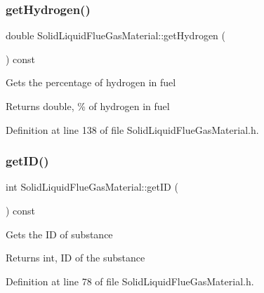 \subsubsection{\texorpdfstring{get\+Hydrogen()}{getHydrogen()}\hspace{0.1cm}{\footnotesize\ttfamily [3/3]}}
{\footnotesize\ttfamily double Solid\+Liquid\+Flue\+Gas\+Material\+::get\+Hydrogen (\begin{DoxyParamCaption}{ }\end{DoxyParamCaption}) const\hspace{0.3cm}{\ttfamily [inline]}}

Gets the percentage of hydrogen in fuel \begin{DoxyReturn}{Returns}
double, \% of hydrogen in fuel 
\end{DoxyReturn}


Definition at line 138 of file Solid\+Liquid\+Flue\+Gas\+Material.\+h.

\mbox{\label{class_solid_liquid_flue_gas_material_afb124b546137da7ba99e31616198e0c8}} 
\subsubsection{\texorpdfstring{get\+I\+D()}{getID()}\hspace{0.1cm}{\footnotesize\ttfamily [1/3]}}
{\footnotesize\ttfamily int Solid\+Liquid\+Flue\+Gas\+Material\+::get\+ID (\begin{DoxyParamCaption}{ }\end{DoxyParamCaption}) const\hspace{0.3cm}{\ttfamily [inline]}}

Gets the ID of substance \begin{DoxyReturn}{Returns}
int, ID of the substance 
\end{DoxyReturn}


Definition at line 78 of file Solid\+Liquid\+Flue\+Gas\+Material.\+h.

\mbox{\label{class_solid_liquid_flue_gas_material_afb124b546137da7ba99e31616198e0c8}} 
